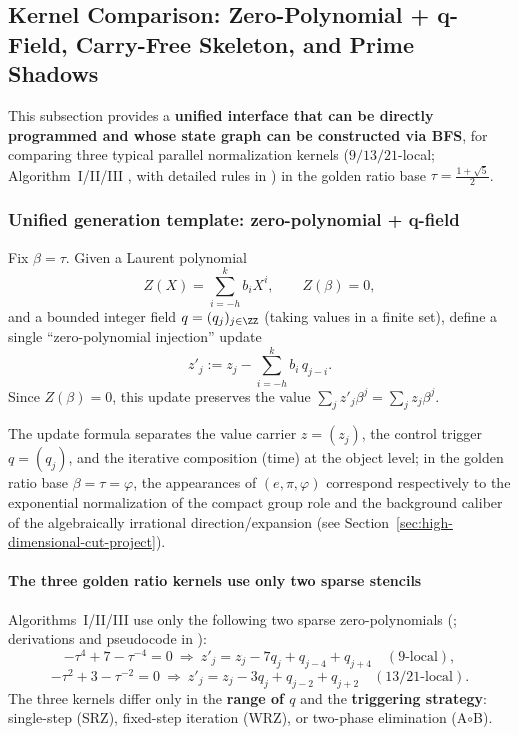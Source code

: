 \subsection{Kernel Comparison: Zero-Polynomial + q-Field, Carry-Free Skeleton, and Prime Shadows}\label{sec:A-kernel-compare-main}
This subsection provides a \textbf{unified interface that can be directly programmed and whose state graph can be constructed via BFS}, for comparing three typical parallel normalization kernels ($9/13/21$-local; Algorithm~I/II/III \cite{SvobodovaAAMPVIIIParallelAddition}, with detailed rules in \cite{FrougnyHellerPelantovaSvobodovaParallelAlgorithmsSlides}) in the golden ratio base $\tau=\frac{1+\sqrt5}{2}$.

\subsubsection{Unified generation template: zero-polynomial + q-field}
Fix $\beta=\tau$. Given a Laurent polynomial
\[
Z(X)=\sum_{i=-h}^{k} b_i X^i,\qquad Z(\beta)=0,
\]
and a bounded integer field $q=(q_j)_{j\in\ZZ}$ (taking values in a finite set), define a single ``zero-polynomial injection'' update
\[
z'_j:=z_j-\sum_{i=-h}^{k} b_i\,q_{j-i}.
\]
Since $Z(\beta)=0$, this update preserves the value $\sum_j z'_j\beta^j=\sum_j z_j\beta^j$.

\begin{remark}\label{rem:z-q-iter-epi-phi}
The update formula separates the value carrier \(z=(z_j)\), the control trigger \(q=(q_j)\), and the iterative composition (time) at the object level; in the golden ratio base \(\beta=\tau=\varphi\), the appearances of \((e,\pi,\varphi)\) correspond respectively to the exponential normalization of the compact group role and the background caliber of the algebraically irrational direction/expansion (see Section~\ref{sec:high-dimensional-cut-project}).
\end{remark}

\paragraph{The three golden ratio kernels use only two sparse stencils}
Algorithms~I/II/III use only the following two sparse zero-polynomials (\cite{SvobodovaAAMPVIIIParallelAddition}; derivations and pseudocode in \cite{FrougnyHellerPelantovaSvobodovaParallelAlgorithmsSlides}):
\[
-\tau^4+7-\tau^{-4}=0\ \Rightarrow\ z'_j=z_j-7q_j+q_{j-4}+q_{j+4}\quad (9\text{-local}),
\]
\[
-\tau^2+3-\tau^{-2}=0\ \Rightarrow\ z'_j=z_j-3q_j+q_{j-2}+q_{j+2}\quad (13/21\text{-local}).
\]
The three kernels differ only in the \textbf{range of $q$} and the \textbf{triggering strategy}: single-step (SRZ), fixed-step iteration (WRZ), or two-phase elimination (A$\circ$B).

